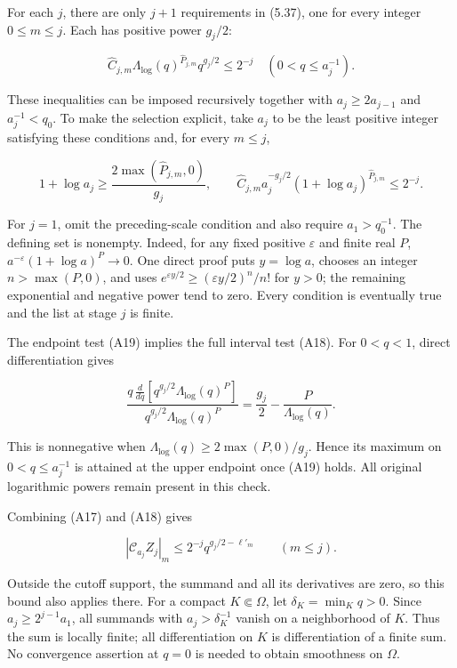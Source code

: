 \documentclass[10pt,a4paper]{article}
\newcounter{none}
\begin{document}
For each \(j\), there are only \(j+1\) requirements in (5.37), one for every integer \(0\le m\le j\). Each has positive power \(g_j/2\):

\[
\widehat C_{j,m}\Lambda_{\log}(q)^{\widehat P_{j,m}}q^{g_j/2}\le2^{-j}
\quad(0<q\le a_j^{-1}).
\tag{A18}
\]

These inequalities can be imposed recursively together with \(a_j\ge2a_{j-1}\) and \(a_j^{-1}<q_0\). To make the selection explicit, take \(a_j\) to be the least positive integer satisfying these conditions and, for every \(m\le j\),

\[
1+\log a_j\ge\frac{2\max(\widehat P_{j,m},0)}{g_j},\qquad
\widehat C_{j,m}a_j^{-g_j/2}(1+\log a_j)^{\widehat P_{j,m}}\le2^{-j}.
\tag{A19}
\]

For \(j=1\), omit the preceding-scale condition and also require \(a_1>q_0^{-1}\). The defining set is nonempty. Indeed, for any fixed positive \(\varepsilon\) and finite real \(P\), \(a^{-\varepsilon}(1+\log a)^P\to0\). One direct proof puts \(y=\log a\), chooses an integer \(n>\max(P,0)\), and uses \(e^{\varepsilon y/2}\ge(\varepsilon y/2)^n/n!\) for \(y>0\); the remaining exponential and negative power tend to zero. Every condition is eventually true and the list at stage \(j\) is finite.

The endpoint test (A19) implies the full interval test (A18). For \(0<q<1\), direct differentiation gives

\[
\frac{q\,\frac{d}{dq}[q^{g_j/2}\Lambda_{\log}(q)^P]}
     {q^{g_j/2}\Lambda_{\log}(q)^P}
=\frac{g_j}{2}-\frac{P}{\Lambda_{\log}(q)}.
\tag{A20}
\]

This is nonnegative when \(\Lambda_{\log}(q)\ge2\max(P,0)/g_j\). Hence its maximum on \(0<q\le a_j^{-1}\) is attained at the upper endpoint once (A19) holds. All original logarithmic powers remain present in this check.

Combining (A17) and (A18) gives

\[
|\mathcal C_{a_j}Z_j|_m\le2^{-j}q^{g_j/2-\ell'_m}\qquad(m\le j).
\tag{A21}
\]

Outside the cutoff support, the summand and all its derivatives are zero, so this bound also applies there. For a compact \(K\Subset\Omega\), let \(\delta_K=\min_Kq>0\). Since \(a_j\ge2^{j-1}a_1\), all summands with \(a_j>\delta_K^{-1}\) vanish on a neighborhood of \(K\). Thus the sum is locally finite; all differentiation on \(K\) is differentiation of a finite sum. No convergence assertion at \(q=0\) is needed to obtain smoothness on \(\Omega\).
\end{document}
